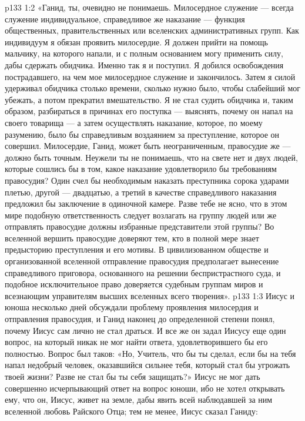 \vs p133 1:2 «Ганид, ты, очевидно не понимаешь. Милосердное служение --- всегда служение индивидуальное, справедливое же наказание --- функция общественных, правительственных или вселенских административных групп. Как индивидуум я обязан проявить милосердие. Я должен прийти на помощь мальчику, на которого напали, и с полным основанием могу применить силу, дабы сдержать обидчика. Именно так я и поступил. Я добился освобождения пострадавшего, на чем мое милосердное служение и закончилось. Затем я силой удерживал обидчика столько времени, сколько нужно было, чтобы слабейший мог убежать, а потом прекратил вмешательство. Я не стал судить обидчика и, таким образом, разбираться в причинах его поступка --- выяснять, почему он напал на своего товарища --- а затем осуществлять наказание, которое, по моему разумению, было бы справедливым воздаянием за преступление, которое он совершил. Милосердие, Ганид, может быть неограниченным, правосудие же --- должно быть точным. Неужели ты не понимаешь, что на свете нет и двух людей, которые сошлись бы в том, какое наказание удовлетворило бы требованиям правосудия? Один счел бы необходимым наказать преступника сорока ударами плетью, другой --- двадцатью, а третий в качестве справедливого наказания предложил бы заключение в одиночной камере. Разве тебе не ясно, что в этом мире подобную ответственность следует возлагать на группу людей или же отправлять правосудие должны избранные представители этой группы? Во вселенной вершить правосудие доверяют тем, кто в полной мере знает предысторию преступления и его мотивы. В цивилизованном обществе и организованной вселенной отправление правосудия предполагает вынесение справедливого приговора, основанного на решении беспристрастного суда, и подобное исключительное право доверяется судебным группам миров и всезнающим управителям высших вселенных всего творения».
\vs p133 1:3 Иисус и юноша несколько дней обсуждали проблему проявления милосердия и отправления правосудия, и Ганид наконец до определенной степени понял, почему Иисус сам лично не стал драться. И все же он задал Иисусу еще один вопрос, на который никак не мог найти ответа, удовлетворившего бы его полностью. Вопрос был таков: «Но, Учитель, что бы ты сделал, если бы на тебя напал недобрый человек, оказавшийся сильнее тебя, который стал бы угрожать твоей жизни? Разве не стал бы ты себя защищать?» Иисус не мог дать совершенно исчерпывающий ответ на вопрос юноши, ибо не хотел открывать ему, что он, Иисус, живет на земле, дабы явить всей наблюдавшей за ним вселенной любовь Райского Отца; тем не менее, Иисус сказал Ганиду:
